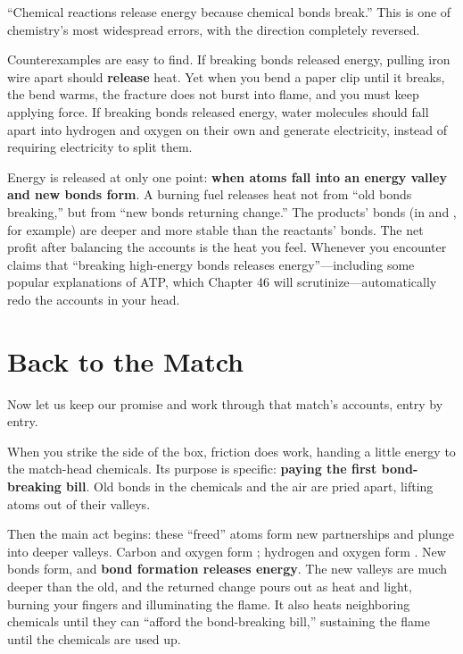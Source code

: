 \begin{wuqu}
``Chemical reactions release energy because chemical bonds break.'' This is one of chemistry's most widespread errors, with the direction completely reversed.

Counterexamples are easy to find. If breaking bonds released energy, pulling iron wire apart should \textbf{release} heat. Yet when you bend a paper clip until it breaks, the bend warms, the fracture does not burst into flame, and you must keep applying force. If breaking bonds released energy, water molecules should fall apart into hydrogen and oxygen on their own and generate electricity, instead of requiring electricity to split them.

Energy is released at only one point: \textbf{when atoms fall into an energy valley and new bonds form}. A burning fuel releases heat not from ``old bonds breaking,'' but from ``new bonds returning change.'' The products' bonds (in  and , for example) are deeper and more stable than the reactants' bonds. The net profit after balancing the accounts is the heat you feel. Whenever you encounter claims that ``breaking high-energy bonds releases energy''---including some popular explanations of ATP, which Chapter 46 will scrutinize---automatically redo the accounts in your head.
\end{wuqu}

\section{Back to the Match}

Now let us keep our promise and work through that match's accounts, entry by entry.

When you strike the side of the box, friction does work, handing a little energy to the match-head chemicals. Its purpose is specific: \textbf{paying the first bond-breaking bill}. Old bonds in the chemicals and the air are pried apart, lifting atoms out of their valleys.

Then the main act begins: these ``freed'' atoms form new partnerships and plunge into deeper valleys. Carbon and oxygen form ; hydrogen and oxygen form . New bonds form, and \textbf{bond formation releases energy}. The new valleys are much deeper than the old, and the returned change pours out as heat and light, burning your fingers and illuminating the flame. It also heats neighboring chemicals until they can ``afford the bond-breaking bill,'' sustaining the flame until the chemicals are used up.

